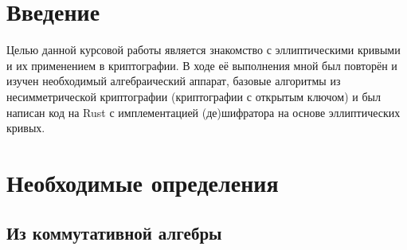 \documentclass[a4paper,14pt]{extarticle}
\begin{document}
\newpage

{
    \hypersetup{linkcolor=black}
    \tableofcontents
}

\newpage

\section{Введение}

Целью данной курсовой работы является знакомство с эллиптическими кривыми и их
применением в криптографии. В ходе её выполнения мной был повторён и изучен
необходимый алгебраический аппарат, базовые алгоритмы из несимметрической
криптографии (криптографии с открытым ключом) и был написан код на Rust с
имплементацией (де)шифратора на основе эллиптических кривых.

\newpage

\section{Необходимые определения}

\subsection{Из коммутативной алгебры}
\end{document}
